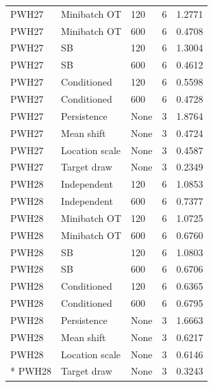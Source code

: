 {\begin{longtable}{@{}p{30mm}p{48mm}p{23mm}p{25mm}p{36mm}@{}}
PWH27 & Minibatch OT & 120 & 6 & 1.2771 \\
PWH27 & Minibatch OT & 600 & 6 & 0.4708 \\
PWH27 & SB & 120 & 6 & 1.3004 \\
PWH27 & SB & 600 & 6 & 0.4612 \\
PWH27 & Conditioned & 120 & 6 & 0.5598 \\
PWH27 & Conditioned & 600 & 6 & 0.4728 \\
PWH27 & Persistence & None & 3 & 1.8764 \\
PWH27 & Mean shift & None & 3 & 0.4724 \\
PWH27 & Location scale & None & 3 & 0.4587 \\
PWH27 & Target draw & None & 3 & 0.2349 \\
PWH28 & Independent & 120 & 6 & 1.0853 \\
PWH28 & Independent & 600 & 6 & 0.7377 \\
PWH28 & Minibatch OT & 120 & 6 & 1.0725 \\
PWH28 & Minibatch OT & 600 & 6 & 0.6760 \\
PWH28 & SB & 120 & 6 & 1.0803 \\
PWH28 & SB & 600 & 6 & 0.6706 \\
PWH28 & Conditioned & 120 & 6 & 0.6365 \\
PWH28 & Conditioned & 600 & 6 & 0.6795 \\
PWH28 & Persistence & None & 3 & 1.6663 \\
PWH28 & Mean shift & None & 3 & 0.6217 \\
PWH28 & Location scale & None & 3 & 0.6146 \\*
PWH28 & Target draw & None & 3 & 0.3243 \\
\end{longtable}
}
